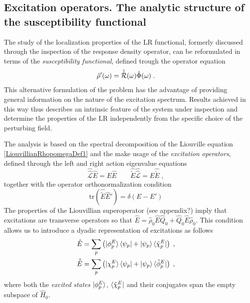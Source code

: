 \documentclass[reprint,aps,prb]{revtex4-1}
\newcommand{\be}{\begin{equation}}
\newcommand{\ee}{\end{equation}}
\newcommand{\nn}{\notag}
\newcommand{\qq}{\qquad}
\newcommand{\lb}{\label}
\newcommand{\op}[1]{\hat {#1}}
\newcommand{\sop}[1]{\op{\op {#1}}}
\newcommand{\trace}[1]{\mathrm{tr}\left(#1\right)}
\newcommand{\dmnot}{\op{\rho}_0}
\newcommand{\dm}{\op{\rho}}
\newcommand{\hnot}{\op{H}_0}
\newcommand{\Liouv}{\sop{\mathcal L}}
\begin{document}
\subsection{Excitation operators. The analytic structure of the susceptibility functional} %

The study of the localization properties of the LR functional, formerly discussed through the inspection of the response density operator, can be reformulated in terms of the 
\emph{susceptibility functional}, defined trough the operator equation  
\be\lb{SusceptibilityDef1}
\dm'(\omega) = \sop{{\cal R}}(\omega) \op\Phi(\omega) \;. 
\ee
This alternative formulation of the problem has the advantage of providing general information on the nature of the excitation spectrum. Results achieved in this way thus describes an intrinsic 
feature of the system under inspection and determine the properties of the LR independently from the specific choice of the perturbing field. 

The analysis is based on the spectral decomposition of the Liouville equation \eqref{LiouvillianRhopomegaDef1} and the make usage of the \emph{excitation operators}, defined through the 
left and right action eigenvalue equations 
\be\lb{ExcitationOperatorsDef1}
\Liouv \op E = E \op E \qq \op{\tilde E} \Liouv = E \op{\tilde E} \;,
\ee
together with the operator orthonormalization condition %
\be\lb{orthoExcitatioOpDef1}
\trace{\op{\tilde E}\op E'} = \delta(E-E')
\ee
The properties of the Liouvillian superoperator (see appendix?) imply that excitations are transverse 
operators so that $\op E = \dmnot\op E\op Q_0 + \op Q_0\op E\dmnot$. This condition allows us to introduce a dyadic representation of excitations as follows
\begin{align}\lb{ExcitationOperatorsDef2}
\op E &= \sum_p \left( \ket{\phi^E_p}\bra{\psi_p} + \ket{\psi_p} \bra{\tilde\chi^E_p}\right)\;, \nn \\
\op{\tilde E} &= \sum_p \left( \ket{\chi^E_p}\bra{\psi_p} + \ket{\psi_p} \bra{\tilde\phi^E_p}\right)\;,
\end{align}
where both the \emph{excited states} $\ket{\phi^E_p}$, $\bra{\tilde\chi^E_p}$ and their conjugates span the empty subspace of $\hnot$. 
\end{document}
